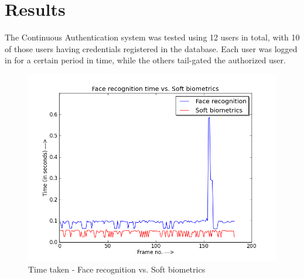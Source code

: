 \documentclass[12pt]{article}			%
\begin{document}
\newpage

\section{ Results }
The Continuous Authentication system was tested using 12 users in total, with 10 of those users having credentials registered in the database. Each user was logged in for a certain period in time, while the others tail-gated the authorized user. 

\begin{figure}[b]
	\caption{Time taken - Face recognition vs. Soft biometrics}
	\centering
		\includegraphics[scale=0.6]{img/face_vs_soft.png}
\end{figure}
\end{document}

